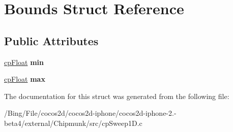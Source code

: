 \hypertarget{struct_bounds}{\section{Bounds Struct Reference}
\label{struct_bounds}
}
\subsection*{Public Attributes}
\begin{DoxyCompactItemize}
\item 
\hypertarget{struct_bounds_a77868c2e1435d3a1c8e65eb54f404d8d}{\hyperlink{group__basic_types_gac1ed65573e035bf892505768c852d8d3}{cp\-Float} {\bfseries min}}\label{struct_bounds_a77868c2e1435d3a1c8e65eb54f404d8d}

\item 
\hypertarget{struct_bounds_ac599024c982d79da6fe1ab39dbd7e36b}{\hyperlink{group__basic_types_gac1ed65573e035bf892505768c852d8d3}{cp\-Float} {\bfseries max}}\label{struct_bounds_ac599024c982d79da6fe1ab39dbd7e36b}

\end{DoxyCompactItemize}


The documentation for this struct was generated from the following file\-:\begin{DoxyCompactItemize}
\item 
/\-Bing/\-File/cocos2d/cocos2d-\/iphone/cocos2d-\/iphone-\/2.-\/beta4/external/\-Chipmunk/src/cp\-Sweep1\-D.\-c\end{DoxyCompactItemize}
